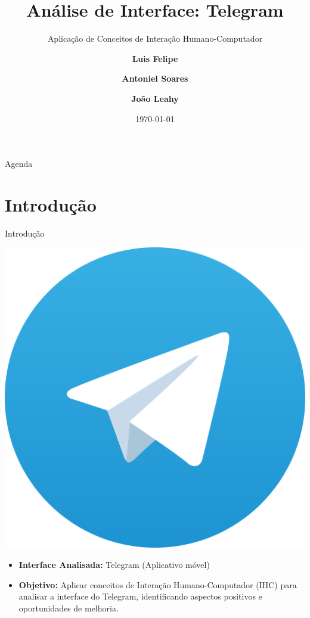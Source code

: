 \documentclass[aspectratio=169,xcolor=table]{beamer}
\author[Sena, Luis Felipe; Soares, Antoniel; Leahy, João]{%
  \textbf{Luis Felipe} \and \textbf{Antoniel Soares} \and \textbf{João Leahy}
}
\title{Análise de Interface: Telegram}
\subtitle{Aplicação de Conceitos de Interação Humano-Computador}
\institute{Universidade Federal da Bahia \\ Instituto de Computação}
\date{\today}
\begin{document}
\begin{frame}
    \titlepage
\end{frame}

\begin{frame}{Agenda}
    \tableofcontents
\end{frame}

\setlength{\parskip}{1em}

\section{Introdução}
\begin{frame}{Introdução}
    \begin{center}
        \includegraphics[height=0.4\textheight]{telegram-logo.png}
    \end{center}
    \vspace{0.5em}
    \begin{itemize}
        \item \textbf{Interface Analisada:} Telegram (Aplicativo móvel)
        \item \textbf{Objetivo:} Aplicar conceitos de Interação Humano-Computador (IHC) para analisar a interface do Telegram, identificando aspectos positivos e oportunidades de melhoria.
    \end{itemize}
\end{frame}
\end{document}
